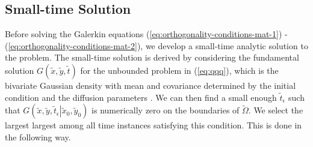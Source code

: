 \subsection{Small-time Solution} \label{sec:pde-small-t}
Before solving the Galerkin equations
(\ref{eq:orthogonality-conditions-mat-1}) -
(\ref{eq:orthogonality-conditions-mat-2}), we develop a small-time
analytic solution to the problem. The small-time solution is derived
by considering the fundamental solution $G(\tilde{x},\tilde{y},\tilde{t})$ for the unbounded
problem in (\ref{eq:qqq}), which is the bivariate Gaussian density with
mean and covariance determined by the initial condition and the
diffusion parameters \cite{stakgold2011green}. We can then find a
small enough $\tilde{t}_\epsilon$ such that
$G\left(\tilde{x},\tilde{y}, \tilde{t}_\epsilon \left| \tilde{x}_0,
    \tilde{y}_0 \right.\right)$ is numerically zero on
the boundaries of $\tilde{\Omega}$. We select the largest largest among all
time instances satisfying this condition. This is done in the
following way.
